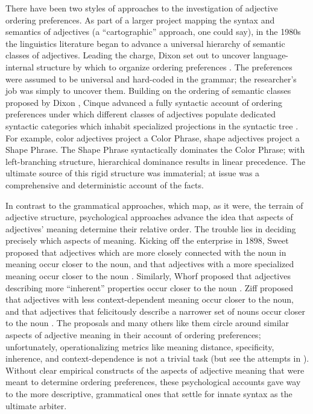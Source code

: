 \documentclass{pnastwo}
\begin{document}
\begin{article}
There have been two styles of approaches to the investigation of adjective ordering preferences. 
As part of a larger project mapping the syntax and semantics of adjectives (a ``cartographic'' approach, one could say), in the 1980s the linguistics literature began to advance a universal hierarchy of semantic classes of adjectives. Leading the charge, Dixon set out to uncover language-internal structure by which to organize ordering preferences \cite{dixon1982}. The preferences were assumed to be universal and hard-coded in the grammar; the researcher's job was simply to uncover them. 
Building on the ordering of semantic classes proposed by Dixon \cite{dixon1982}, Cinque advanced a fully syntactic account of ordering preferences under which different classes of adjectives populate dedicated syntactic categories which inhabit specialized projections in the syntactic tree \cite{cinque1994}. For example, color adjectives project a Color Phrase, shape adjectives project a Shape Phrase. The Shape Phrase syntactically dominates the Color Phrase; with left-branching structure, hierarchical dominance results in linear precedence. The ultimate source of this rigid structure was immaterial; at issue was a comprehensive and deterministic account of the facts.

In contrast to the grammatical approaches, which map, as it were, the terrain of adjective structure, psychological approaches advance the idea that aspects of adjectives' meaning determine their relative order. The trouble lies in deciding precisely which aspects of meaning. Kicking off the enterprise in 1898, Sweet proposed that adjectives which are more closely connected with the noun in meaning occur closer to the noun, and that adjectives with a more specialized meaning occur closer to the noun \cite{sweet1898}. Similarly, Whorf proposed that adjectives describing more ``inherent'' properties occur closer to the noun \cite{whorf1947}. Ziff proposed that adjectives with less context-dependent meaning occur closer to the noun, and that adjectives that felicitously describe a narrower set of nouns occur closer to the noun \cite{ziff1960}. The proposals and many others like them \cite{XXX} circle around similar aspects of adjective meaning in their account of ordering preferences; unfortunately, operationalizing metrics like meaning distance, specificity, inherence, and context-dependence is not a trivial task (but see the attempts in \cite{martin1969determinants}). Without clear empirical constructs of the aspects of adjective meaning that were meant to determine ordering preferences, these psychological accounts gave way to the more descriptive, grammatical ones that settle for innate syntax as the ultimate arbiter.  %


\end{article}
\end{document}
